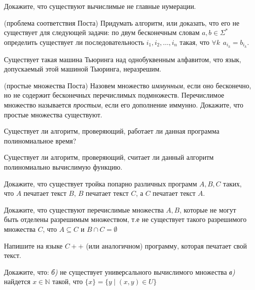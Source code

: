 \setcounter{curtask}{20}


\begin{task}
    Докажите, что существуют вычислимые не главные нумерации.
\end{task}

\begin{task} (проблема соответствия Поста)
    Придумать алгоритм, или доказать, что его не существует для
    следующей задачи: по двум бесконечным словам $a, b \in \Sigma^*$
    определить существует ли последовательность $i_1, i_2, \dots, i_n$
	такая, что $\forall k ~~ a_{i_k} = b_{i_k}$.
\end{task}

\begin{task}
    Существует такая машина Тьюринга над однобуквенным алфавитом, что
	язык, допускаемый этой машиной Тьюринга, неразрешим.
\end{task}

\begin{task} (простые множества Поста)
    Назовем множество {\it иммунным}, если оно бесконечно, но не
    содержит бесконечных перечислимых подмножеств. Перечислимое
    множество называется {\it простым}, если его дополнение иммунно.
    Докажите, что простые множества существуют.
\end{task}



\breakline

\begin{ptask}{8}
    Существует ли алгоритм, проверяющий, работает ли данная программа
    полиномиальное время?
\end{ptask}

\begin{ptask}{14}
    Существует ли алгоритм, проверяющий, считает ли данный алгоритм
    полиномиально вычислимую функцию.
\end{ptask}

\begin{ptask}{16}
    Докажите, что существует тройка попарно различных программ $A, B,
    C$ таких, что $A$ печатает текст $B$, $B$ печатает текст $C$, а
    $C$ печатает текст $A$.
\end{ptask}

\begin{ptask}{17}
    Докажите, что существуют перечислимые множества $A, B$, которые не
    могут быть отделены разрешимым множеством, т.е не существует
    такого разрешимого множества $C$, что $A \subseteq C$ и $B \cap C
    = \emptyset$
\end{ptask}

\begin{ptask}{18}
    Напишите на языке $C++$ (или аналогичном) программу, которая
    печатает свой текст.
\end{ptask}

\begin{ptask}{19}
    Докажите, что: 
    {\it б)} не существует универсального вычислимого множества
    {\it в)} найдется $x \in \mathbb{N}$ такой, что $\{x\} = \{y
    \mid (x, y) \in U\}$
\end{ptask}